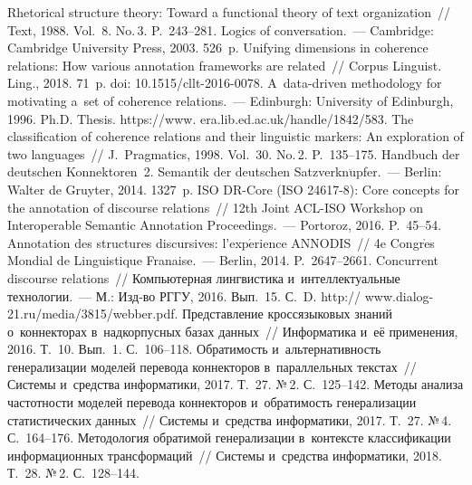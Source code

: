 \begin{multicols}{2}
{{\begin{thebibliography}{99}
 
 Rhetorical structure theory: Toward a functional theory of 
text organization~// Text, 1988. Vol.~8. No.\,3. 
P.~243--281.
 Logics of conversation.~--- Cambridge: Cambridge University 
Press, 2003. 526~p.
 Unifying dimensions in coherence relations: How various annotation 
frameworks are related~// Corpus Linguist. Ling., 2018. 71~p. 
doi: 10.1515/cllt-2016-0078. 
 A~data-driven methodology for motivating a~set of coherence relations.~--- 
Edinburgh: University of Edinburgh, 1996. Ph.D. Thesis. {\sf 
https://www. era.lib.ed.ac.uk/handle/1842/583}.
 The classification of coherence relations and their linguistic 
markers: An exploration of two languages~// J.~Pragmatics, 1998. Vol.~30. No.\,2.  
P.~135--175.
 Handbuch der deutschen 
Konnektoren~2. Semantik der deutschen Satzverkn$\ddot{\mbox{u}}$pfer.~--- Berlin: Walter 
de Gruyter, 2014. 1327~p.
 ISO DR-Core (ISO 24617-8): Core concepts for the annotation of 
discourse relations~// 12th Joint ACL-ISO Workshop on Interoperable Semantic Annotation 
Proceedings.~--- Portoroz, 2016. P.~45--54.
 Annotation des structures 
discursives: l'exp$\acute{\mbox{e}}$rience ANNODIS~// 4e Congr$\grave{\mbox{e}}$s 
Mondial de Linguistique \mbox{Fran{\!}aise}.~--- Berlin, 2014. 
P.~2647--2661.
 Concurrent discourse relations~// 
Компьютерная лингвистика и~интеллектуальные технологии.~---
М.: Изд-во РГГУ, 2016. Вып.~15. С.~D. 
{\sf http:// www.dialog-21.ru/media/3815/webber.pdf}.
 Представление 
кроссязыковых знаний о~коннекторах в~надкорпусных базах данных~// Информатика 
и~её применения, 2016. Т.~10. Вып.~1. С.~106--118.
 Обратимость и~альтернативность 
генерализации моделей\linebreak
 перевода коннекторов в~параллельных текстах~// Сис\-те\-мы 
и~средства информатики, 2017. Т.~27. №\,2. С.~125--142.
 Методы анализа частотности 
моделей перевода коннекторов и~обратимость генерализации статистических данных~// 
Системы и~средства информатики, 2017. Т.~27. №\,4. С.~164--176.
 Методология обратимой генерализации в~контексте классификации 
информационных трансформаций~// Системы и~средства информатики, 2018. Т.~28. №\,2. 
С.~128--144.
 \end{thebibliography}

 }
 }

\end{multicols}

